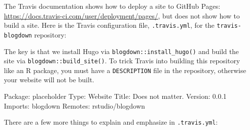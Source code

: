 \documentclass[12pt,]{krantz}
\makeatletter
\newenvironment{Shaded}{\begin{snugshade}}{\end{snugshade}}
\newcommand{\AttributeTok}[1]{\textcolor[rgb]{0.77,0.63,0.00}{#1}}
\newcommand{\FunctionTok}[1]{\textcolor[rgb]{0.00,0.00,0.00}{#1}}
\newcommand{\KeywordTok}[1]{\textcolor[rgb]{0.13,0.29,0.53}{\textbf{#1}}}
\newcommand{\NormalTok}[1]{#1}
\newcommand{\StringTok}[1]{\textcolor[rgb]{0.31,0.60,0.02}{#1}}
\newenvironment{kframe}{%
\medskip{}
\setlength{\fboxsep}{.8em}
 \def\at@end@of@kframe{}%
 \ifinner\ifhmode%
  \def\at@end@of@kframe{\end{minipage}}%
  \begin{minipage}{\columnwidth}%
 \fi\fi%
 \def\FrameCommand##1{\hskip\@totalleftmargin \hskip-\fboxsep
 \colorbox{shadecolor}{##1}\hskip-\fboxsep
     \hskip-\linewidth \hskip-\@totalleftmargin \hskip\columnwidth}%
 \MakeFramed {\advance\hsize-\width
   \@totalleftmargin\z@ \linewidth\hsize
   \@setminipage}}%
 {\par\unskip\endMakeFramed%
 \at@end@of@kframe}
\renewenvironment{Shaded}{\begin{kframe}}{\end{kframe}}
\theoremstyle{definition}
\theoremstyle{definition}
\theoremstyle{definition}
\theoremstyle{remark}
\makeatother
\begin{document}
The Travis documentation shows how to deploy a site to GitHub Pages:
\url{https://docs.travis-ci.com/user/deployment/pages/}, but does not
show how to build a site. Here is the Travis configuration file,
\texttt{.travis.yml}, for the \texttt{travis-blogdown} repository:

\begin{Shaded}
\end{Shaded}

The key is that we install Hugo via \texttt{blogdown::install\_hugo()}
and build the site via \texttt{blogdown::build\_site()}. To trick Travis
into building this repository like an R package, you must have a
\texttt{DESCRIPTION} file in the repository, otherwise your website will
not be built.

\begin{Shaded}
\begin{Highlighting}[]
\FunctionTok{Package:}\AttributeTok{ placeholder}
\FunctionTok{Type:}\AttributeTok{ Website}
\FunctionTok{Title:}\AttributeTok{ Does not matter.}
\FunctionTok{Version:}\AttributeTok{ 0.0.1}
\FunctionTok{Imports:}\AttributeTok{ blogdown}
\FunctionTok{Remotes:}\AttributeTok{ rstudio/blogdown}
\end{Highlighting}
\end{Shaded}

There are a few more things to explain and emphasize in
\texttt{.travis.yml}:
\end{document}
